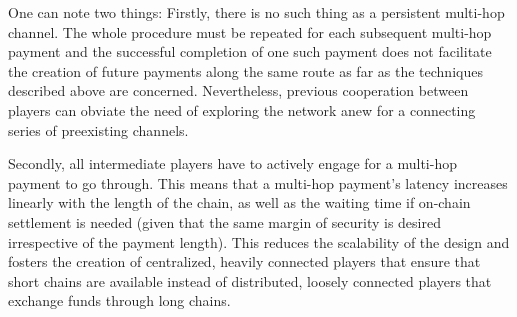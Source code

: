     One can note two things: Firstly, there is no such thing as a persistent multi-hop
    channel. The whole procedure must be repeated for each subsequent multi-hop payment
    and the successful completion of one such payment does not facilitate the creation of
    future payments along the same route as far as the techniques described above are
    concerned. Nevertheless, previous cooperation between players can obviate the need of
    exploring the network anew for a connecting series of preexisting channels.

    Secondly, all intermediate players have to actively engage for a multi-hop payment to
    go through. This means that a multi-hop payment's latency increases linearly with the
    length of the chain, as well as the waiting time if on-chain settlement is needed
    (given that the same margin of security is desired irrespective of the payment
    length). This reduces the scalability of the design and fosters the creation of
    centralized, heavily connected players that ensure that short chains are available
    instead of distributed, loosely connected players that exchange funds through long
    chains.
